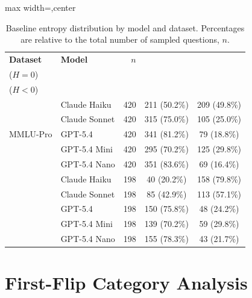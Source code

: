 \begin{table}[t]
\centering
\footnotesize
\setlength{\tabcolsep}{2.5pt}
\renewcommand{\arraystretch}{1.08}

\caption{Baseline entropy distribution by model and dataset.
Percentages are relative to the total number of sampled questions,
$n$.}
\label{tab:entropy_dist}

\begin{adjustbox}{max width=\columnwidth,center}
\begin{tabular}{@{}llrcc@{}}
\toprule
\textbf{Dataset}
& \textbf{Model}
& \textbf{$n$}
& \makecell{\textbf{Certain}\\[-2pt]\scriptsize($H=0$)}
& \makecell{\textbf{Uncertain}\\[-2pt]\scriptsize($H<0$)} \\
\midrule

\multirow{5}{*}{MMLU-Pro}
  & Claude Haiku
  & 420 & 211 {\scriptsize(50.2\%)} & 209 {\scriptsize(49.8\%)} \\
  & Claude Sonnet
  & 420 & 315 {\scriptsize(75.0\%)} & 105 {\scriptsize(25.0\%)} \\
  & GPT-5.4
  & 420 & 341 {\scriptsize(81.2\%)} & 79 {\scriptsize(18.8\%)} \\
  & GPT-5.4 Mini
  & 420 & 295 {\scriptsize(70.2\%)} & 125 {\scriptsize(29.8\%)} \\
  & GPT-5.4 Nano
  & 420 & 351 {\scriptsize(83.6\%)} & 69 {\scriptsize(16.4\%)} \\
\addlinespace
\midrule
\multirow{5}{*}{GPQA-Diam.}
  & Claude Haiku
  & 198 &  40 \scriptsize(20.2\%) & 158 \scriptsize(79.8\%) \\
  & Claude Sonnet
  & 198 &  85 \scriptsize(42.9\%) & 113 \scriptsize(57.1\%) \\
  & GPT-5.4
  & 198 & 150 {\scriptsize(75.8\%)} & 48 {\scriptsize(24.2\%)} \\
  & GPT-5.4 Mini
  & 198 & 139 {\scriptsize(70.2\%)} & 59 {\scriptsize(29.8\%)} \\
  & GPT-5.4 Nano
  & 198 & 155 {\scriptsize(78.3\%)} & 43 {\scriptsize(21.7\%)} \\
\bottomrule
\end{tabular}
\end{adjustbox}
\end{table}

\section{First-Flip Category Analysis}
\label{app:first_flip}


